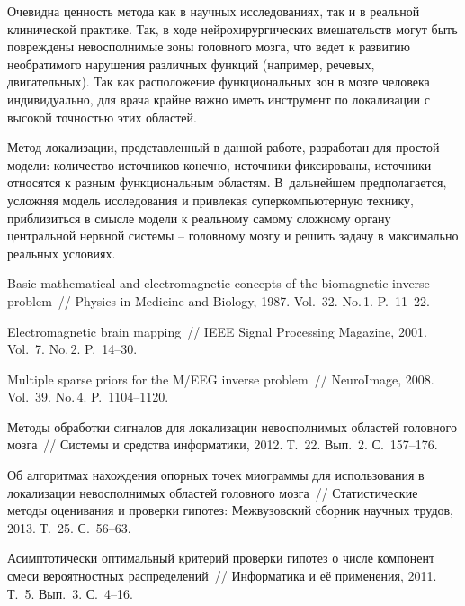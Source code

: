 \begin{multicols}{2}
Очевидна ценность метода как в научных исследованиях, так и в
реальной клинической практике. Так, в ходе нейрохирургических
вмешательств могут быть повреждены невосполнимые зоны головного
мозга, что ведет к развитию необратимого нарушения различных функций
(например, речевых, двигательных). Так как расположение
функциональных зон в мозге человека индивидуально, для врача крайне
важно иметь инструмент по локализации с высокой точностью этих
областей.

Метод локализации, представленный в данной работе, разработан для
простой модели: количест\-во источников конечно, источники
фиксированы, источники относятся к разным функциональным областям.
В~дальнейшем предполагается, усложняя модель исследования и привлекая
суперкомпьютерную технику, приблизиться в смысле модели к реальному
самому сложному органу центральной нервной системы -- головному
мозгу и решить задачу в максимально реальных условиях.

{\small\frenchspacing
{%
\begin{thebibliography}{99}

 Basic mathematical and electromagnetic concepts of
the biomagnetic inverse problem~// Physics in Medicine and Biology,
1987. Vol.~32. No.\,1. P.~11--22.

 Electromagnetic brain
mapping~// IEEE Signal Processing Magazine, 2001. Vol.~7. No.\,2.
P.~14--30.

 Multiple
sparse priors for the M/EEG inverse problem~// NeuroImage, 2008.
Vol.~39. No.\,4. P.~1104--1120.

 Методы
обработки сигналов для локализации невосполнимых областей головного
мозга~// Системы и средства информатики, 2012. Т.~22. Вып.~2.
С.~157--176.

  Об алгоритмах нахождения
опорных точек миограммы для использования в локализации
невосполнимых областей головного мозга~// Статистические методы
оценивания и проверки гипотез: Межвузовский сборник научных трудов,
2013. Т.~25. С.~56--63.

 Асимптотически
оптимальный критерий проверки гипотез о числе компонент смеси
вероятностных распределений~// Информатика и её применения, 2011.
Т.~5. Вып.~3. С.~4--16.


\end{thebibliography}}}
\end{multicols}
